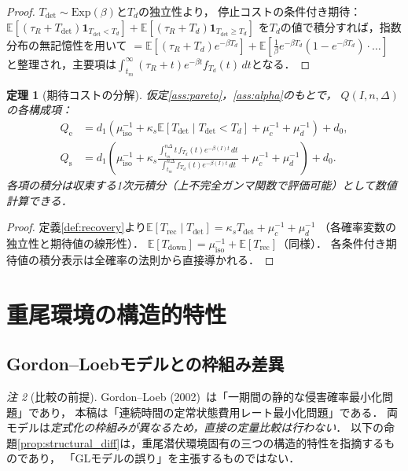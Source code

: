\documentclass[12pt,a4paper]{article}
\theoremstyle{plain}
\newtheorem{theorem}{定理}[section]
\theoremstyle{definition}
\theoremstyle{remark}
\newtheorem{remark}[theorem]{注}
\newcommand{\E}{\mathbb{E}}
\newcommand{\Qe}{Q_{\mathrm{e}}}
\newcommand{\Qs}{Q_{\mathrm{s}}}
\newcommand{\Tdet}{T_{\mathrm{det}}}
\newcommand{\Trec}{T_{\mathrm{rec}}}
\newcommand{\Tdown}{T_{\mathrm{down}}}
\newcommand{\betaI}{\beta(I)}
\begin{document}
\begin{proof}
$\Tdet\sim\mathrm{Exp}(\beta)$と$T_d$の独立性より，
停止コストの条件付き期待：
$\E[(\tau_R+\Tdet)\mathbf{1}_{\Tdet<T_d}]+\E[(\tau_R+T_d)\mathbf{1}_{\Tdet\ge T_d}]$
を$T_d$の値で積分すれば，指数分布の無記憶性を用いて
$=\E[(\tau_R+T_d)e^{-\beta T_d}]+\E[\frac{1}{\beta}e^{-\beta T_d}(1-e^{-\beta T_d})\cdot\ldots]$
と整理され，主要項は$\int_{t_m}^\infty(\tau_R+t)e^{-\beta t}f_{T_d}(t)\,dt$となる．
\end{proof}

\begin{theorem}[期待コストの分解]\label{thm:cost_decomp}
仮定\ref{ass:pareto}，\ref{ass:alpha}のもとで，
$Q(I,n,\Delta)$の各構成項：
\begin{align}
\Qe &= d_1\!\left(\mu_{\mathrm{iso}}^{-1}+\kappa_s\E[\Tdet\mid\Tdet<T_d]+\mu_c^{-1}+\mu_d^{-1}\right)+d_0,
\label{eq:Qe}\\
\Qs &= d_1\!\left(\mu_{\mathrm{iso}}^{-1}+\kappa_s\frac{\int_{t_m}^{n\Delta}t\,f_{T_d}(t)e^{-\betaI t}\,dt}
{\int_{t_m}^{n\Delta}f_{T_d}(t)e^{-\betaI t}\,dt}+\mu_c^{-1}+\mu_d^{-1}\right)+d_0.
\label{eq:Qs}
\end{align}
各項の積分は収束する1次元積分（上不完全ガンマ関数で評価可能）として数値計算できる．
\end{theorem}

\begin{proof}
定義\ref{def:recovery}より$\E[\Trec\mid\Tdet]=\kappa_s\Tdet+\mu_c^{-1}+\mu_d^{-1}$
（各確率変数の独立性と期待値の線形性）．
$\E[\Tdown]=\mu_{\mathrm{iso}}^{-1}+\E[\Trec]$（同様）．
各条件付き期待値の積分表示は全確率の法則から直接導かれる．
\end{proof}

\section{重尾環境の構造的特性}
\label{sec:structure}

\subsection{Gordon--Loebモデルとの枠組み差異}

\begin{remark}[比較の前提]\label{rem:gl_scope}
Gordon--Loeb (2002)~\cite{gordon2002}は「一期間の静的な侵害確率最小化問題」であり，
本稿は「連続時間の定常状態費用レート最小化問題」である．
両モデルは\emph{定式化の枠組みが異なるため，直接の定量比較は行わない}．
以下の命題\ref{prop:structural_diff}は，重尾潜伏環境固有の三つの構造的特性を指摘するものであり，
「GLモデルの誤り」を主張するものではない．
\end{remark}
\end{document}
